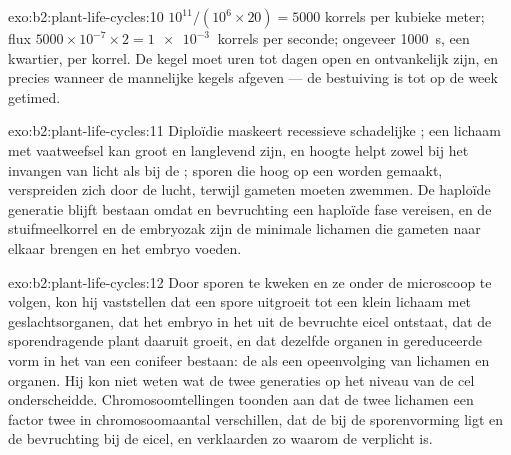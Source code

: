 \begin{solution}{exo:b2:plant-life-cycles:10}
$10^{11}/(10^{6}\times 20) = \num{5000}$ korrels per kubieke meter; flux
$5000\times 10^{-7}\times 2 = \qty{1e-3}{}$ korrels per seconde; ongeveer
\qty{1000}{s}, een kwartier, per korrel. De kegel moet uren tot dagen open
en ontvankelijk zijn, en precies wanneer de mannelijke kegels 
afgeven --- de bestuiving is tot op de week getimed.
\end{solution}

\begin{solution}{exo:b2:plant-life-cycles:11}
Diploïdie maskeert recessieve schadelijke ; een  lichaam
met vaatweefsel kan groot en langlevend zijn, en hoogte helpt zowel bij
het invangen van licht als bij de ; sporen die hoog
op een  worden gemaakt, verspreiden zich door de lucht, terwijl
gameten moeten zwemmen. De haploïde generatie blijft bestaan omdat 
en bevruchting een haploïde fase vereisen, en de stuifmeelkorrel en de
embryozak zijn de minimale lichamen die gameten naar elkaar brengen en het
embryo voeden.
\end{solution}

\begin{solution}{exo:b2:plant-life-cycles:12}
Door sporen te kweken en ze onder de microscoop te volgen, kon hij
vaststellen dat een spore uitgroeit tot een klein lichaam met
geslachtsorganen, dat het embryo in het  uit de bevruchte eicel
ontstaat, dat de sporendragende plant daaruit groeit, en dat dezelfde
organen in gereduceerde vorm in het  van een conifeer bestaan:
de  als een opeenvolging van lichamen en organen. Hij kon
niet weten wat de twee generaties op het niveau van de cel onderscheidde.
Chromosoomtellingen toonden aan dat de twee lichamen een factor twee in
chromosoomaantal verschillen, dat de  bij de sporenvorming ligt en de
bevruchting bij de eicel, en verklaarden zo waarom de 
verplicht is.
\end{solution}

